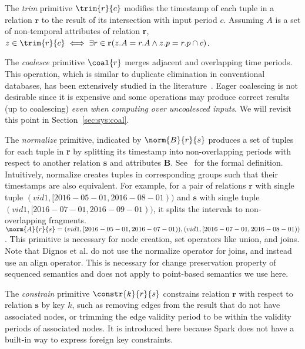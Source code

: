 The {\em trim} primitive $\trim{r}{c}$ modifies the
timestamp of each tuple in a relation $\mathbf{r}$ to the result of
its intersection with input period $c$.  Assuming $A$ is a set of
non-temporal attributes of relation {\bf r}, $z \in
\trim{r}{c} \iff \exists r \in \mathbf{r}(z.A = r.A
\wedge z.p = r.p \cap c)$.

The {\em coalesce} primitive $\coal{r}$ merges adjacent
and overlapping time periods.  This operation, which is similar to
duplicate elimination in conventional databases, has been extensively
studied in the
literature~\cite{DBLP:conf/vldb/BohlenSS96,DBLP:journals/sigmod/Zimanyi06}.
Eager coalescing is not desirable since it is expensive and some
operations may produce correct results (up to coalescing) {\em even
  when computing over uncoalesced inputs}.  We will revisit this point in
Section~\ref{sec:sys:coal}.

The {\em normalize} primitive, indicated by $\norm{B}{r}{s}$ produces
a set of tuples for each tuple in {\bf r} by splitting its timestamp
into non-overlapping periods with respect to another relation {\bf s}
and attributes {\bf B}.  See~\cite{Dignos2012} for the formal
definition.  Intuitively, normalize creates tuples in corresponding
groups such that their timestamps are also equivalent.  For example,
for a pair of relations $\mathbf{r}$ with single tuple $(vid1,
[2016-05-01, 2016-08-01))$ and $\mathbf{s}$ with single tuple $(vid1,
  [2016-07-01, 2016-09-01))$, it splits the intervals to
    non-overlapping fragments. $\norm{A}{r}{s} = (vid1, [2016-05-01,
      2016-07-01)),(vid1, [2016-07-01, 2016-08-01))$.  This primitive
        is necessary for node creation, set operators like union, and
        joins.  Note that Dignos et al. do not use the normalize
        operator for joins, and instead use an align operator.  This
        is necessary for change preservation property of sequenced
        semantics and does not apply to point-based semantics we use
        here.

The {\em constrain} primitive $\constr{k}{r}{s}$ constrains relation
$\mathbf{r}$ with respect to relation $\mathbf{s}$ by key $k$, such as
removing edges from the result that do not have associated nodes, or
trimming the edge validity period to be within the validity periods of
associated nodes.  It is introduced here because Spark does not have a
built-in way to express foreign key constraints.

